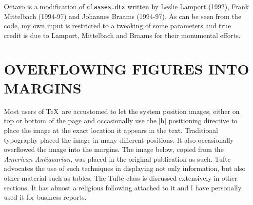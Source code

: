  Octavo is a modification of \texttt{classes.dtx} written by Leslie Lamport (1992),
 Frank Mittelbach (1994-97) and Johannes Braams (1994-97). As can be seen
 from the code, my own input is restricted to a tweaking of some parameters
 and true credit is due to Lamport, Mittelbach and Braams for their
 monumental efforts.



\begin{comment}
 \begin{thebibliography}{16}

 \bibitem{knuth98} Knuth,~D. 1998. \emph{Digital Typography}. CSLI 
 Publications, Stanford.

 \bibitem{rosarivo61} Rosarivo,~R. 1961. \emph{Divina proportio typographica}. 
 Scherpe, Krefeld.

 \bibitem{taylor98} Taylor,~P. 1998. \emph{Book design for \TeX\ users, Part 1: 
 Theory.} TUGBoat, 19:65--74.

 \bibitem{taylor99} Taylor,~P. 1999. \emph{Book design for \TeX\ users, Part 2:
 Practice.} TUGBoat, 20:378--389.

 \bibitem{town} Town,~L. \emph{Bookbinding by hand.} Faber \& Faber, London.

 \bibitem{tschichold87} Tschichold,~ J. 1987. \emph{Ausgew\"{a}hlte Aufs\"{a}tze
 \"{u}ber Fragen der Gestalt des Buches und der Typographie}. Birkh\"{a}user
 Verlag, Basel.

 \bibitem{williamson66} Williamson,~H. 1966. \emph{Methods of book design.} Oxford 
 University Press, Oxford.

 \bibitem{wilson01} Wilson,~P. 2001. \emph{The Memoir class for configurable
 typesetting.} CTAN. \url{macros\\latex\\contrib\\memoir} 

 \end{thebibliography}
\end{comment}





\chapter[Overflowing Figures into Margins]{OVERFLOWING FIGURES INTO MARGINS}

Most users of \TeX\ are accustomed to let the system position images, either on top or bottom of the page and occasionally use the [h] positioning directive to place the image at the exact location it appears in the text. Traditional typography placed the image in many different positions. It also occasionally overflowed the image into the margins. The image below, copied from the \textit{American Antiquarian}, was placed in the original publication as such. Tufte advocates the use of such techniques in displaying not only information, but also other material such as tables. The Tufte class is discussed extensively in other sections. It has almost a religious following attached to it and I have personally used it for business reports. \citep{seraphini}

